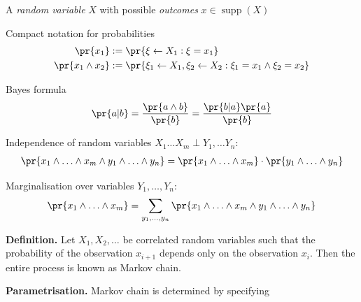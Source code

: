 \documentclass[landscape,footrule]{foils}
\DeclareMathOperator{\supp}{supp}
\begin{document}
\titlefoil



\enlargethispage{0.9cm}
\begin{triangles}
\item A \emph{random variable} $X$ with possible \emph{outcomes} $x\in\supp(X)$
\item Compact notation for probabilities \vspace*{-1ex}
\begin{align*}
\pr{x_1}&:=\pr{\xi\gets X_1: \xi=x_1}\\
\pr{x_1\wedge x_2}&:=\pr{\xi_1\gets X_1,\xi_2\gets X_2 : \xi_1=x_1\wedge \xi_2=x_2}
\end{align*}\vspace*{-4ex}
\item Bayes formula \vspace*{-2ex}
\begin{align*}
\pr{a|b}=\frac{\pr{a\wedge b}}{\pr{b}}=\frac{\pr{b|a}\pr{a}}{\pr{b}}
\end{align*}\vspace*{-4ex}
\item Independence of random variables $X_1\ldots X_m\perp Y_1,\ldots Y_n$: \vspace*{-1ex}
\begin{align*}
 \pr{x_1\wedge\ldots\wedge x_m\wedge y_1\wedge\ldots\wedge y_n}=\pr{x_1\wedge\ldots\wedge x_m}\cdot\pr{y_1\wedge\ldots\wedge y_n}
\end{align*}\vspace*{-4ex}
\item Marginalisation over variables $Y_1,\ldots, Y_n$: \vspace*{-1ex}
\begin{align*}
 \pr{x_1\wedge\ldots\wedge x_m}=\sum_{y_1,\ldots,y_n}\pr{x_1\wedge\ldots\wedge x_m \wedge y_1\wedge\ldots\wedge y_n}
\end{align*} 
\end{triangles}



\textbf{Definition.}
Let $X_1, X_2,\ldots$ be correlated random variables such that the probability of the observation $x_{i+1}$ depends only on the observation $x_{i}$.
Then the entire process is known as Markov chain.

\vspace*{1cm}

\textbf{Parametrisation.}
Markov chain is determined by specifying 
\end{document}

